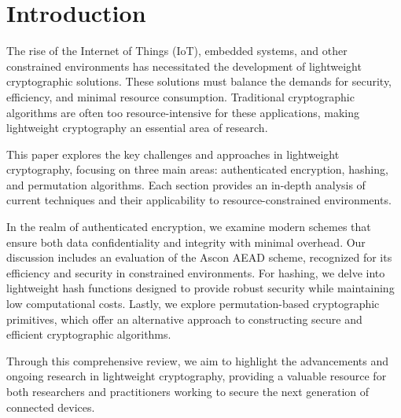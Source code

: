 \section{Introduction}
The rise of the Internet of Things (IoT), embedded systems, and other constrained environments has necessitated the development of lightweight cryptographic solutions. These solutions must balance the demands for security, efficiency, and minimal resource consumption. Traditional cryptographic algorithms are often too resource-intensive for these applications, making lightweight cryptography an essential area of research.

This paper explores the key challenges and approaches in lightweight cryptography, focusing on three main areas: authenticated encryption, hashing, and permutation algorithms. Each section provides an in-depth analysis of current techniques and their applicability to resource-constrained environments. 

In the realm of authenticated encryption, we examine modern schemes that ensure both data confidentiality and integrity with minimal overhead. Our discussion includes an evaluation of the Ascon AEAD scheme, recognized for its efficiency and security in constrained environments. For hashing, we delve into lightweight hash functions designed to provide robust security while maintaining low computational costs. Lastly, we explore permutation-based cryptographic primitives, which offer an alternative approach to constructing secure and efficient cryptographic algorithms.

Through this comprehensive review, we aim to highlight the advancements and ongoing research in lightweight cryptography, providing a valuable resource for both researchers and practitioners working to secure the next generation of connected devices.
